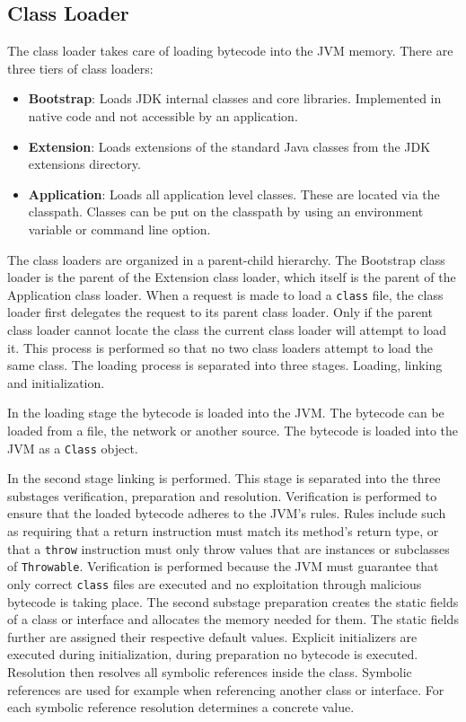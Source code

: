 \subsection{Class Loader}

The class loader takes care of loading bytecode into the JVM memory. There are three tiers of class loaders:

\begin{itemize}
    \item \textbf{Bootstrap}: Loads JDK internal classes and core libraries. Implemented in native code and not accessible by an application. 
    \item \textbf{Extension}: Loads extensions of the standard Java classes from the JDK extensions directory. 
    \item \textbf{Application}: Loads all application level classes. These are located via the classpath. Classes can be put on the classpath by using an environment variable or command line option. 
\end{itemize}

The class loaders are organized in a parent-child hierarchy. The Bootstrap class loader is the parent of the Extension class loader, which itself is the parent of the Application class loader. When a request is made to load a \texttt{class} file, the class loader first delegates the request to its parent class loader. Only if the parent class loader cannot locate the class the current class loader will attempt to load it. This process is performed so that no two class loaders attempt to load the same class. The loading process is separated into three stages. Loading, linking and initialization.

In the loading stage the bytecode is loaded into the JVM. The bytecode can be loaded from a file, the network or another source. The bytecode is loaded into the JVM as a \texttt{Class} object.

In the second stage linking is performed. This stage is separated into the three substages verification, preparation and resolution. Verification is performed to ensure that the loaded bytecode adheres to the JVM's rules. Rules include such as requiring that a return instruction must match its method's return type, or that a \texttt{throw} instruction must only throw values that are instances or subclasses of \texttt{Throwable}. Verification is performed because the JVM must guarantee that only correct \texttt{class} files are executed and no exploitation through malicious bytecode is taking place. The second substage preparation creates the static fields of a class or interface and allocates the memory needed for them. The static fields further are assigned their respective default values. Explicit initializers are executed during initialization, during preparation no bytecode is executed. Resolution then resolves all symbolic references inside the class. Symbolic references are used for example when referencing another class or interface. For each symbolic reference resolution determines a concrete value. 

